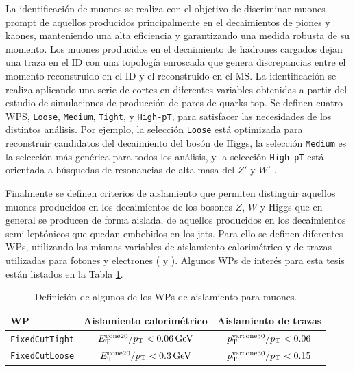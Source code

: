 La identificación de muones se realiza con el objetivo de discriminar muones prompt de aquellos producidos principalmente en el decaimientos de piones y kaones, manteniendo una alta eficiencia y garantizando una medida robusta de su momento. Los muones producidos en el decaimiento de hadrones cargados dejan una traza en el ID con una topología enroscada 
que genera discrepancias entre el momento reconstruido en el ID y el reconstruido en el MS. La identificación se realiza aplicando una serie de cortes en diferentes variables \cite{PERF-2015-10} obtenidas a partir del estudio de simulaciones de producción de pares de quarks top. Se definen cuatro WPS, \texttt{Loose}, \texttt{Medium}, \texttt{Tight}, y \texttt{High-pT}, para satisfacer las necesidades de los distintos análisis. Por ejemplo, la selección \texttt{Loose} está optimizada para reconstruir candidatos del decaimiento del bosón de Higgs, la selección \texttt{Medium} es la selección más genérica para todos los análisis, y la selección \texttt{High-pT} está orientada a búsquedas de resonancias de alta masa del $Z'$ y $W'$ \cite{EXOT-2016-18,EXOT-2016-06,EXOT-2016-05,EXOT-2015-04}. 

Finalmente se definen criterios de aislamiento que permiten distinguir aquellos muones producidos en los decaimientos de los bosones $Z$, $W$ y Higgs que en general se producen de forma aislada, de aquellos producidos en los decaimientos semi-leptónicos que quedan embebidos en los jets. Para ello se definen diferentes
WPs, utilizando las mismas variables de aislamiento calorimétrico y de trazas utilizadas para fotones y electrones ( y ). Algunos WPs de interés para esta tesis están listados en la {Tabla \ref{tab:muon_WPs}}.

\begin{table} 
\centering
\caption{Definición de algunos de los WPs de aislamiento para muones. 
}
  \begin{tabular}{ l c c}

  \hline
  \hline

    WP & Aislamiento calorimétrico & Aislamiento de trazas \\

    \hline
    \hline

    \texttt{FixedCutTight} & $E_{\text{T}}^{\text{cone20}}/p_{\text{T}} < 0.06\,\text{GeV}$ & $p_{\text{T}}^{\text{varcone30}}/p_{\text{T}}<0.06$ \\

    \texttt{FixedCutLoose} & $E_{\text{T}}^{\text{cone20}}/p_{\text{T}} < 0.3\,\text{GeV}$  & $p_{\text{T}}^{\text{varcone30}}/p_{\text{T}}<0.15$ \\



    \hline
    \hline

  \end{tabular}
\label{tab:muon_WPs}
\end{table}

